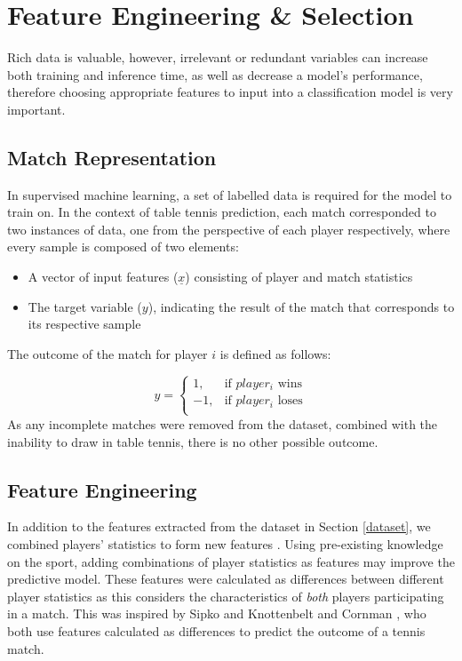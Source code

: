 \section{Feature Engineering \& Selection} \label{features}
Rich data is valuable, however, irrelevant or redundant variables can increase both training and inference time, as well as decrease a model's performance, therefore choosing appropriate features to input into a classification model is very important.

\subsection{Match Representation}
In supervised machine learning, a set of labelled data is required for the model to train on. In the context of table tennis prediction, each match corresponded to two instances of data, one from the perspective of each player respectively, where every sample is composed of two elements:
\begin{itemize}
    \item A vector of input features ($\underline{x}$) consisting of player and match statistics
    \item The target variable ($y$), indicating the result of the match that corresponds to its respective sample
\end{itemize}
The outcome of the match for player $i$ is defined as follows:

$$
    y =
    \begin{cases}
    1, &\text{if $player_i$ wins} \\ 
    -1, &\text{if $player_i$ loses} \\
    \end{cases}
$$
As any incomplete matches were removed from the dataset, combined with the inability to draw in table tennis, there is no other possible outcome.

\subsection{Feature Engineering}
In addition to the features extracted from the dataset in Section \ref{dataset}, we combined players' statistics to form new features \cite{barnett2005combining}. Using pre-existing knowledge on the sport, adding combinations of player statistics as features may improve the predictive model. These features were calculated as differences between different player statistics as this considers the characteristics of \textit{both} players participating in a match. This was inspired by Sipko and Knottenbelt \cite{sipko2015machine} and Cornman \etal \cite{cornman2017machine}, who both use features calculated as differences to predict the outcome of a tennis match.

